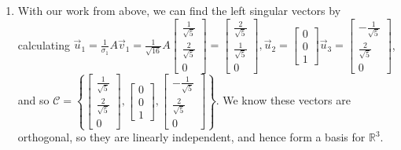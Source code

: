 \documentclass[10pt,english]{article}
\begin{document}
\begin{enumerate}
\begin{enumerate}
        \item With our work from above, we can find the left singular vectors by calculating $\vec{u}_1=\frac{1}{\sigma_1}A\vec{v}_1=\frac{1}{\sqrt{16}}A\begin{bmatrix}\frac{1}{\sqrt{5}}\\\frac{2}{\sqrt{5}}\\0\end{bmatrix}=\begin{bmatrix}\frac{2}{\sqrt{5}}\\\frac{1}{\sqrt{5}}\\0\end{bmatrix},\vec{u}_2=\begin{bmatrix}0\\0\\1\end{bmatrix}\vec{u}_3=\begin{bmatrix}-\frac{1}{\sqrt{5}}\\\frac{2}{\sqrt{5}}\\0\end{bmatrix}$, and so $\mathcal{C}=\left\{\begin{bmatrix}\frac{1}{\sqrt{5}}\\\frac{2}{\sqrt{5}}\\0\end{bmatrix},\begin{bmatrix}0\\0\\1\end{bmatrix},\begin{bmatrix}-\frac{1}{\sqrt{5}}\\\frac{2}{\sqrt{5}}\\0\end{bmatrix}\right\}$. We know these vectors are orthogonal, so they are linearly independent, and hence form a basis for $\mathbb{R}^3$. 

\end{enumerate}
\end{enumerate}
\end{document}
